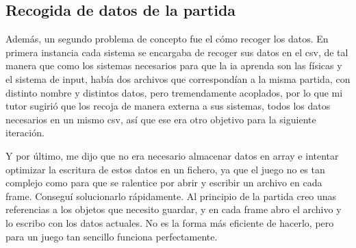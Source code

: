 \subsection{Recogida de datos de la partida}
Además, un segundo problema de concepto fue el cómo recoger los datos. En primera instancia cada sistema se encargaba de recoger sus datos en el \gls{csv}, de tal manera que como los sistemas necesarios para que la \gls{ia} aprenda son las físicas y el sistema de input, había dos archivos que correspondían a la misma partida, con distinto nombre y distintos datos, pero tremendamente acoplados, por lo que mi tutor sugirió que los recoja de manera externa a sus sistemas, todos los datos necesarios en un mismo \gls{csv}, así que ese era otro objetivo para la siguiente iteración. 

Y por último, me dijo que no era necesario almacenar datos en array e intentar optimizar la escritura de estos datos en un fichero, ya que el juego no es tan complejo como para que se ralentice por abrir y escribir un archivo en cada frame. Conseguí solucionarlo rápidamente. Al principio de la partida creo unas referencias a los objetos que necesito guardar, y en cada frame abro el archivo y lo escribo con los datos actuales. No es la forma más eficiente de hacerlo, pero para un juego tan sencillo funciona perfectamente.

